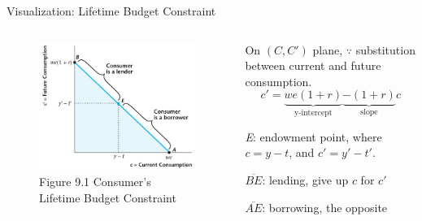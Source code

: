 \documentclass[11pt,aspectratio=169,usenames,dvipsnames]{beamer}
\let\tempone\itemize
\let\temptwo\enditemize
\renewenvironment{itemize}{\tempone\addtolength{\itemsep}{\fill}}{\temptwo}
\begin{document}
\begin{frame}{Visualization: Lifetime Budget Constraint}
\label{slide:Visualization__Lifetime_Budget_Constraint}
    \begin{columns}
        \begin{column}{0.5\textwidth}
            \begin{figure}
                \caption{\scriptsize Figure 9.1 Consumer’s Lifetime Budget Constraint}
                \includegraphics[width=\textwidth]{./figures/Figure9_1.jpg}
            \end{figure}
        \end{column}
        \begin{column}{0.5\textwidth}
            On $ ( C, C' ) $ plane, $ \because $ substitution between current and future consumption.
            \begin{equation*}
                 c' = \underbrace{we ( 1+r )}_{\text{y-intercept}} \underbrace{-( 1+r )}_{\text{slope}} c
            \end{equation*}
            \begin{itemize}
                \item \textit{E}: \alert{endowment point}, where $ c = y-t $, and $ c' = y' - t' $.
                \item $\overline{BE}$: lending, give up $ c $ for $ c' $
                \item $\overline{AE}$: borrowing, the opposite
            \end{itemize}
        \end{column}
    \end{columns}
\end{frame}
\end{document}
